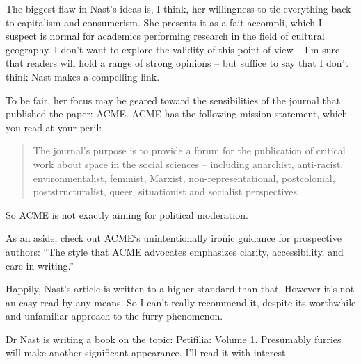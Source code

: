 \secdiv

The biggest flaw in Nast's ideas is, I think, her willingness to tie everything back to capitalism and consumerism. She presents it as a fait accompli, which I suspect is normal for academics performing research in the field of cultural geography. I don't want to explore the validity of this point of view -- I'm sure that readers will hold a range of strong opinions -- but suffice to say that I don't think Nast makes a compelling link.

To be fair, her focus may be geared toward the sensibilities of the journal that published the paper: ACME. ACME has the following mission statement, which you read at your peril:

\begin{quote}
  The journal's purpose is to provide a forum for the publication of critical work about space in the social sciences  --  including anarchist, anti-racist, environmentalist, feminist, Marxist, non-representational, postcolonial, poststructuralist, queer, situationist and socialist perspectives.
\end{quote}

So ACME is not exactly aiming for political moderation.

As an aside, check out ACME`s unintentionally ironic guidance for prospective authors: ``The style that ACME advocates emphasizes clarity, accessibility, and care in writing.''

Happily, Nast's article is written to a higher standard than that. However it's not an easy read by any means. So I can't really recommend it, despite its worthwhile and unfamiliar approach to the furry phenomenon.

Dr Nast is writing a book on the topic: Petifilia: Volume 1. Presumably furries will make another significant appearance. I'll read it with interest.
